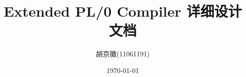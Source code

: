 \documentclass[a4paper,fleqn]{article}
\begin{document}
\begin{CJK*}{UTF8}{gbsn}
\title{Extended PL/0 Compiler 详细设计文档}
\author{胡京徽(11061191)}
\date{\today}
\maketitle
\clearpage





\end{CJK*}
\end{document}
